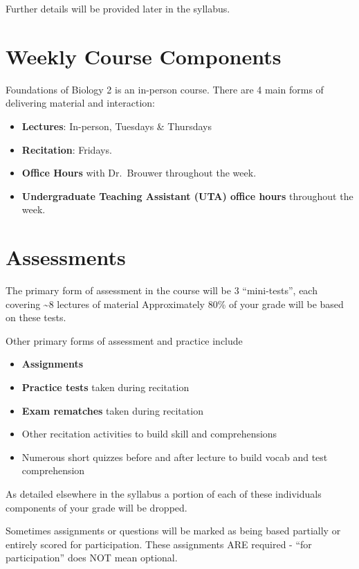 \documentclass[
]{book}
\providecommand{\tightlist}{%
  \setlength{\itemsep}{0pt}\setlength{\parskip}{0pt}}
\begin{document}
Further details will be provided later in the syllabus.

\hypertarget{weekly-course-components}{%
\section{Weekly Course Components}\label{weekly-course-components}}

Foundations of Biology 2 is an in-person course. There are 4 main forms of delivering material and interaction:

\begin{itemize}
\tightlist
\item
  \textbf{Lectures}: In-person, Tuesdays \& Thursdays
\item
  \textbf{Recitation}: Fridays.
\item
  \textbf{Office Hours} with Dr.~Brouwer throughout the week.
\item
  \textbf{Undergraduate Teaching Assistant (UTA) office hours} throughout the week.
\end{itemize}

\hypertarget{assessments}{%
\section{Assessments}\label{assessments}}

The primary form of assessment in the course will be 3 ``mini-tests'', each covering \textasciitilde8 lectures of material
Approximately 80\% of your grade will be based on these tests.

Other primary forms of assessment and practice include

\begin{itemize}
\tightlist
\item
  \textbf{Assignments}
\item
  \textbf{Practice tests} taken during recitation
\item
  \textbf{Exam rematches} taken during recitation
\item
  Other recitation activities to build skill and comprehensions
\item
  Numerous short quizzes before and after lecture to build vocab and test comprehension
\end{itemize}

As detailed elsewhere in the syllabus a portion of each of these individuals components of your grade will be dropped.

Sometimes assignments or questions will be marked as being based partially or entirely scored for participation. These assignments ARE required - ``for participation'' does NOT mean optional.
\end{document}

